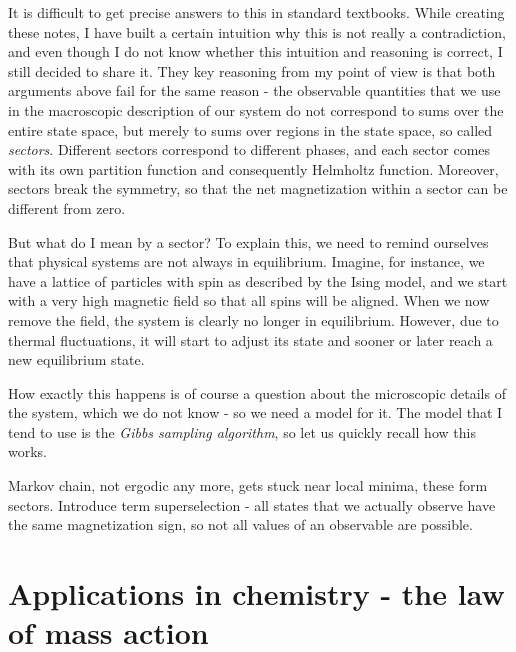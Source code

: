\documentclass[a4paper, draft]{article}
\theoremstyle{own}
\theoremstyle{remark}
\begin{document}
It is difficult to get precise answers to this in standard textbooks. While creating these notes, I have built a certain intuition why this is not really a contradiction, and even though I do not know whether this intuition and reasoning is correct, I still decided to share it. They key reasoning from my point of view is that both arguments above fail for the same reason - the observable quantities that we use in the macroscopic description of our system do not correspond to sums over the entire state space, but merely to sums over regions in the state space, so called {\em sectors}. Different sectors correspond to different phases, and each sector comes with its own partition function and consequently Helmholtz function. Moreover, sectors break the symmetry, so that the net magnetization within a sector can be different from zero.

But what do I mean by a sector? To explain this, we need to remind ourselves that physical systems are not always in equilibrium. Imagine, for instance, we have a lattice of particles with spin as described by the Ising model, and we start with a very high magnetic field so that all spins will be aligned. When we now remove the field, the system is clearly no longer in equilibrium. However, due to thermal fluctuations, it will start to adjust its state and sooner or later reach a new equilibrium state. 

How exactly this happens is of course a question about the microscopic details of the system, which we do not know - so we need a model for it. The model that I tend to use is the {\em Gibbs sampling algorithm}, so let us quickly recall how this works.

Markov chain, not ergodic any more, gets stuck near local minima, these form sectors. Introduce term superselection - all states that we actually observe have the same magnetization sign, so not all values of an observable are possible.
	

\section{Applications in chemistry - the law of mass action}
\end{document}

